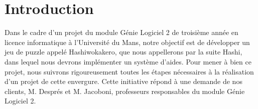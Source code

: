 \section{Introduction}
Dans le cadre d’un projet du module Génie Logiciel 2 de troisième année en licence informatique à l’Université du Mans, notre objectif est de développer un jeu de puzzle appelé Hashiwokakero, que nous appellerons par la suite Hashi, dans lequel nous devrons implémenter un système d'aides.
Pour mener à bien ce projet, nous suivrons rigoureusement toutes les étapes nécessaires à la réalisation d’un projet de cette envergure. Cette initiative répond à une demande de nos clients, M. Després et M. Jacoboni, professeurs responsables du module Génie Logiciel 2.